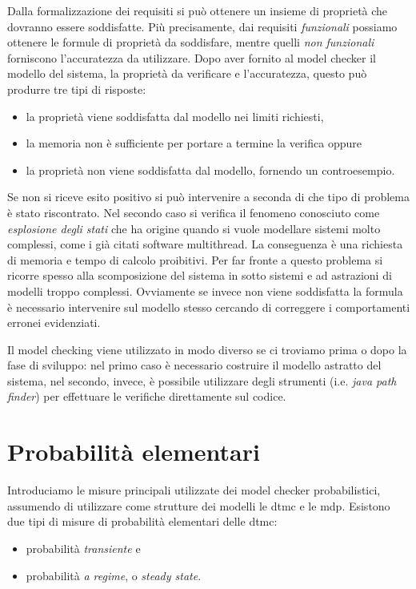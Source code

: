 Dalla formalizzazione dei requisiti si può ottenere un insieme di proprietà che dovranno essere soddisfatte. Più precisamente, dai requisiti \emph{funzionali} possiamo ottenere le formule di proprietà da soddisfare, mentre quelli \emph{non funzionali} forniscono l'accuratezza da utilizzare. Dopo aver fornito al model checker il modello del sistema, la proprietà da verificare e l'accuratezza, questo può produrre tre tipi di risposte:
\begin{itemize}
	\item la proprietà viene soddisfatta dal modello nei limiti richiesti,
	\item la memoria non è sufficiente per portare a termine la verifica oppure
	\item la proprietà non viene soddisfatta dal modello, fornendo un controesempio.
\end{itemize}
Se non si riceve esito positivo si può intervenire a seconda di che tipo di problema è stato riscontrato. Nel secondo caso si verifica il fenomeno conosciuto come \emph{esplosione degli stati} che ha origine quando si vuole modellare sistemi molto complessi, come i già citati software multithread. La conseguenza è una richiesta di memoria e tempo di calcolo proibitivi. Per far fronte a questo problema si ricorre spesso alla scomposizione del sistema in sotto sistemi e ad astrazioni di modelli troppo complessi. Ovviamente se invece non viene soddisfatta la formula è necessario intervenire sul modello stesso cercando di correggere i comportamenti erronei evidenziati.

Il model checking viene utilizzato in modo diverso se ci troviamo prima o dopo la fase di sviluppo: nel primo caso è necessario costruire il modello astratto del sistema, nel secondo, invece, è possibile utilizzare degli strumenti (i.e. \emph{java path finder}) per effettuare le verifiche direttamente sul codice. 

\section{Probabilit\`a elementari}
Introduciamo le misure principali utilizzate dei model checker probabilistici, assumendo di utilizzare come strutture dei modelli le \ac{dtmc} e le \ac{mdp}. Esistono due tipi di misure di probabilità elementari delle \ac{dtmc}:
\begin{itemize}
	\item probabilità \emph{transiente} e
	\item probabilità \emph{a regime}, o \emph{steady state}.
\end{itemize}

